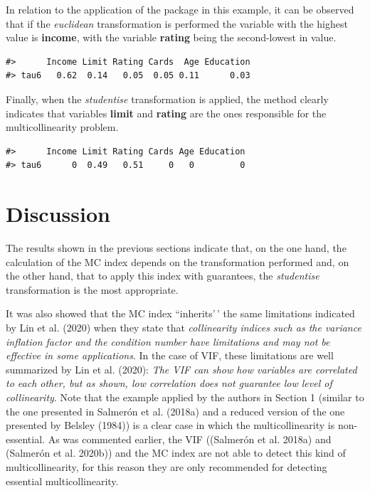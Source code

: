 In relation to the application of the  package in this example, it can be observed that if the \emph{euclidean} transformation is performed the variable with the highest value is \textbf{income}, with the variable \textbf{rating} being the second-lowest in value.

\begin{verbatim}
#>      Income Limit Rating Cards  Age Education
#> tau6   0.62  0.14   0.05  0.05 0.11      0.03
\end{verbatim}

Finally, when the \emph{studentise} transformation is applied, the method clearly indicates that variables \textbf{limit} and \textbf{rating} are the ones responsible for the multicollinearity problem.

\begin{verbatim}
#>      Income Limit Rating Cards Age Education
#> tau6      0  0.49   0.51     0   0         0
\end{verbatim}

\hypertarget{discussion}{%
\section{Discussion}\label{discussion}}

The results shown in the previous sections indicate that, on the one hand, the calculation of the MC index depends on the transformation performed and, on the other hand, that to apply this index with guarantees, the \emph{studentise} transformation is the most appropriate.

It was also showed that the MC index ``inherits'\,' the same limitations indicated by Lin et al. (2020) when they state that \emph{collinearity indices such as the variance inflation factor and the condition number have limitations and may not be effective in some applications}. In the case of VIF, these limitations are well summarized by Lin et al. (2020): \emph{The VIF can show how variables are correlated to each other, but as shown, low correlation does not guarantee low level of collinearity}.
Note that the example applied by the authors in Section 1 (similar to the one presented in Salmerón et al. (2018a) and a reduced version of the one presented by Belsley (1984)) is a clear case in which the multicollinearity is non-essential. As was commented earlier, the VIF ((Salmerón et al. 2018a) and (Salmerón et al. 2020b)) and the MC index are not able to detect this kind of multicollinearity, for this reason they are only recommended for detecting essential multicollinearity.

